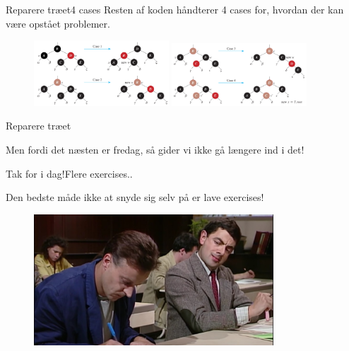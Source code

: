 \documentclass[aspectratio=1610]{beamer}
\begin{document}
\begin{frame}{Reparere træet}{4 cases}
    Resten af koden håndterer 4 cases for, hvordan der kan være opstået
    problemer.

    \begin{figure}[h]
        \centering
        \includegraphics[width=0.45\textwidth]{delete-cases-12}
        \includegraphics[width=0.45\textwidth]{delete-cases-34}
    \end{figure}
\end{frame}


\begin{frame}{Reparere træet}{}
    \begin{center}
        Men fordi det \alert{næsten er fredag}, så gider vi ikke gå længere ind
        i det!
    \end{center}
\end{frame}


\begin{frame}{Tak for i dag!}{Flere exercises..}

    Den bedste måde ikke at snyde sig selv på er lave exercises!

    \begin{figure}[h]
        \centering
        \includegraphics[width=0.8\textwidth]{../exercises}
    \end{figure}
    
\end{frame}
\end{document}
